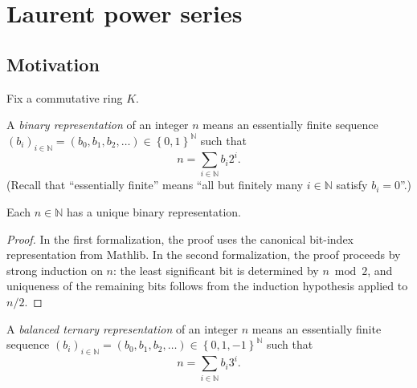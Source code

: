 \section{Laurent power series}

\subsection{Motivation}

Fix a commutative ring $K$.

\begin{definition}
\label{def.fps.laure.binary-rep}
\leanhelper
\leanok
A \emph{binary representation} of an integer $n$ means an essentially finite
sequence $\left(  b_{i}\right)  _{i\in\mathbb{N}}=\left(  b_{0},b_{1}%
,b_{2},\ldots\right)  \in\left\{  0,1\right\}  ^{\mathbb{N}}$ such that%
\[
n=\sum_{i\in\mathbb{N}}b_{i}2^{i}.
\]
(Recall that ``essentially finite'' means
``all but finitely many $i\in\mathbb{N}$ satisfy $b_{i}%
=0$''.)
\end{definition}

\begin{theorem}
\label{thm.fps.laure.binary-rep-uniq}
\leantarget
\leanok
Each $n\in\mathbb{N}$ has a unique binary representation.
\end{theorem}

\begin{proof}
\leanok
In the first formalization, the proof uses
the canonical bit-index representation from Mathlib.
In the second formalization, the proof proceeds
by strong induction on $n$: the least significant bit is determined
by $n \bmod 2$, and uniqueness of the remaining bits follows from
the induction hypothesis applied to $n / 2$.
\end{proof}

\begin{definition}
\label{def.fps.laure.balanced-tern}
\leanhelper
\leanok
A \emph{balanced ternary representation} of an integer $n$ means an
essentially finite sequence $\left(  b_{i}\right)  _{i\in\mathbb{N}}=\left(
b_{0},b_{1},b_{2},\ldots\right)  \in\left\{  0,1,-1\right\}  ^{\mathbb{N}}$
such that%
\[
n=\sum_{i\in\mathbb{N}}b_{i}3^{i}.
\]
\end{definition}

